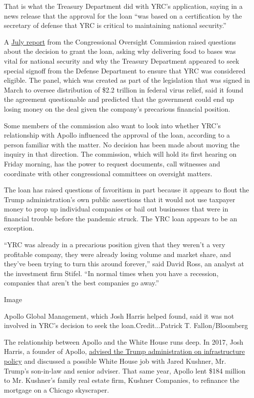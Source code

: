 That is what the Treasury Department did with YRC's application, saying
in a news release that the approval for the loan ``was based on a
certification by the secretary of defense that YRC is critical to
maintaining national security.''

A
\href{https://www.toomey.senate.gov/files/documents/Oversight\%20Commission\%20-\%203rd\%20Report\%20(FINAL)_7.20.20.pdf}{July
report} from the Congressional Oversight Commission raised questions
about the decision to grant the loan, asking why delivering food to
bases was vital for national security and why the Treasury Department
appeared to seek special signoff from the Defense Department to ensure
that YRC was considered eligible. The panel, which was created as part
of the legislation that was signed in March to oversee distribution of
\$2.2 trillion in federal virus relief, said it found the agreement
questionable and predicted that the government could end up losing money
on the deal given the company's precarious financial position.

Some members of the commission also want to look into whether YRC's
relationship with Apollo influenced the approval of the loan, according
to a person familiar with the matter. No decision has been made about
moving the inquiry in that direction. The commission, which will hold
its first hearing on Friday morning, has the power to request documents,
call witnesses and coordinate with other congressional committees on
oversight matters.

The loan has raised questions of favoritism in part because it appears
to flout the Trump administration's own public assertions that it would
not use taxpayer money to prop up individual companies or bail out
businesses that were in financial trouble before the pandemic struck.
The YRC loan appears to be an exception.

``YRC was already in a precarious position given that they weren't a
very profitable company, they were already losing volume and market
share, and they've been trying to turn this around forever,'' said David
Ross, an analyst at the investment firm Stifel. ``In normal times when
you have a recession, companies that aren't the best companies go
away.''

Image

Apollo Global Management, which Josh Harris helped found, said it was
not involved in YRC's decision to seek the loan.Credit...Patrick T.
Fallon/Bloomberg

The relationship between Apollo and the White House runs deep. In 2017,
Josh Harris, a founder of Apollo,
\href{https://www.nytimes.com/2018/02/28/business/jared-kushner-apollo-citigroup-loans.html}{advised
the Trump administration on infrastructure policy} and discussed a
possible White House job with Jared Kushner, Mr. Trump's son-in-law and
senior adviser. That same year, Apollo lent \$184 million to Mr.
Kushner's family real estate firm, Kushner Companies, to refinance the
mortgage on a Chicago skyscraper.

